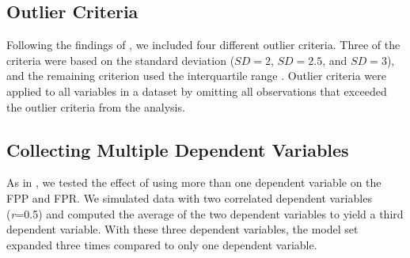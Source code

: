


\subsection{Outlier Criteria}
Following the findings of \cite{Leyes2013}, we included four different outlier criteria. Three of the criteria were based on the standard deviation ($SD = 2$, $SD = 2.5$, and $SD = 3$), and the remaining criterion used the interquartile range \citep{Rousseeuw2011}. Outlier criteria were applied to all variables in a dataset by omitting all observations that exceeded the outlier criteria from the analysis.

\subsection{Collecting Multiple Dependent Variables}
As in \cite{Simmons2011}, we tested the effect of using more than one dependent variable on the FPP and FPR. We simulated data with two correlated dependent variables (\textit{r}=0.5) and computed the average of the two dependent variables to yield a third dependent variable. With these three dependent variables, the model set expanded three times compared to only one dependent variable. 

